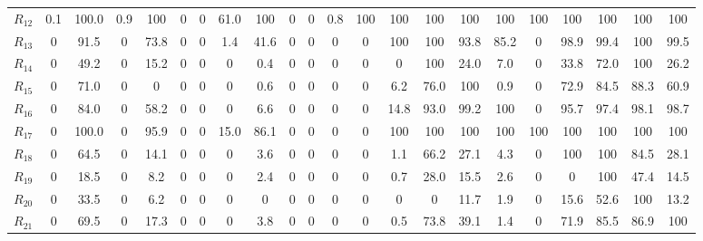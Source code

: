 \begin{table}[h!]
\begin{tabularx}{\textwidth}{X|CCCCCCCCCCCCCCCCCCCCC}
$R_{12}$ & 0.1 & 100.0 & 0.9 & 100 & 0 & 0 & 61.0 & 100 & 0 & 0 & 0.8 & 100 & 100 & 100 & 100 & 100 & 100 & 100 & 100 & 100 & 100 \\
$R_{13}$ & 0 & 91.5 & 0 & 73.8 & 0 & 0 & 1.4 & 41.6 & 0 & 0 & 0 & 0 & 100 & 100 & 93.8 & 85.2 & 0 & 98.9 & 99.4 & 100 & 99.5 \\
$R_{14}$ & 0 & 49.2 & 0 & 15.2 & 0 & 0 & 0 & 0.4 & 0 & 0 & 0 & 0 & 0 & 100 & 24.0 & 7.0 & 0 & 33.8 & 72.0 & 100 & 26.2 \\
$R_{15}$ & 0 & 71.0 & 0 & 0 & 0 & 0 & 0 & 0.6 & 0 & 0 & 0 & 0 & 6.2 & 76.0 & 100 & 0.9 & 0 & 72.9 & 84.5 & 88.3 & 60.9 \\
$R_{16}$ & 0 & 84.0 & 0 & 58.2 & 0 & 0 & 0 & 6.6 & 0 & 0 & 0 & 0 & 14.8 & 93.0 & 99.2 & 100 & 0 & 95.7 & 97.4 & 98.1 & 98.7 \\
$R_{17}$ & 0 & 100.0 & 0 & 95.9 & 0 & 0 & 15.0 & 86.1 & 0 & 0 & 0 & 0 & 100 & 100 & 100 & 100 & 100 & 100 & 100 & 100 & 100 \\
$R_{18}$ & 0 & 64.5 & 0 & 14.1 & 0 & 0 & 0 & 3.6 & 0 & 0 & 0 & 0 & 1.1 & 66.2 & 27.1 & 4.3 & 0 & 100 & 100 & 84.5 & 28.1 \\
$R_{19}$ & 0 & 18.5 & 0 & 8.2 & 0 & 0 & 0 & 2.4 & 0 & 0 & 0 & 0 & 0.7 & 28.0 & 15.5 & 2.6 & 0 & 0 & 100 & 47.4 & 14.5 \\
$R_{20}$ & 0 & 33.5 & 0 & 6.2 & 0 & 0 & 0 & 0 & 0 & 0 & 0 & 0 & 0 & 0 & 11.7 & 1.9 & 0 & 15.6 & 52.6 & 100 & 13.2 \\
$R_{21}$ & 0 & 69.5 & 0 & 17.3 & 0 & 0 & 0 & 3.8 & 0 & 0 & 0 & 0 & 0.5 & 73.8 & 39.1 & 1.4 & 0 & 71.9 & 85.5 & 86.9 & 100 \\
\bottomrule
\end{tabularx}
\end{table}

